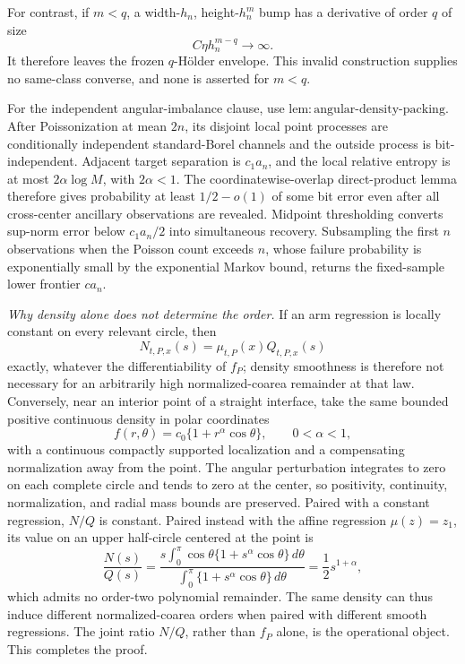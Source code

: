 For contrast, if \(m<q\), a width-\(h_n\), height-\(h_n^m\) bump has a derivative of order \(q\) of size
\[
 C\eta h_n^{m-q}\longrightarrow\infty.
\]
It therefore leaves the frozen \(q\)-H\"older envelope.  This invalid construction supplies no same-class converse, and none is asserted for \(m<q\).

For the independent angular-imbalance clause, use \(\mathrm{lem:angular\text{-}density\text{-}packing}\).  After Poissonization at mean \(2n\), its disjoint local point processes are conditionally independent standard-Borel channels and the outside process is bit-independent.  Adjacent target separation is \(c_1a_n\), and the local relative entropy is at most \(2\alpha\log M\), with \(2\alpha<1\).  The coordinatewise-overlap direct-product lemma therefore gives probability at least \(1/2-o(1)\) of some bit error even after all cross-center ancillary observations are revealed.  Midpoint thresholding converts sup-norm error below \(c_1a_n/2\) into simultaneous recovery.  Subsampling the first \(n\) observations when the Poisson count exceeds \(n\), whose failure probability is exponentially small by the exponential Markov bound, returns the fixed-sample lower frontier \(ca_n\).

\emph{Why density alone does not determine the order.}
If an arm regression is locally constant on every relevant circle, then
\[
 N_{t,P,x}(s)=\mu_{t,P}(x)Q_{t,P,x}(s)
\]
exactly, whatever the differentiability of \(f_P\); density smoothness is therefore not necessary for an arbitrarily high normalized-coarea remainder at that law.  Conversely, near an interior point of a straight interface, take the same bounded positive continuous density in polar coordinates
\[
 f(r,\theta)=c_0\{1+r^\alpha\cos\theta\},
 \qquad 0<\alpha<1,
\]
with a continuous compactly supported localization and a compensating normalization away from the point.  The angular perturbation integrates to zero on each complete circle and tends to zero at the center, so positivity, continuity, normalization, and radial mass bounds are preserved.  Paired with a constant regression, \(N/Q\) is constant.  Paired instead with the affine regression \(\mu(z)=z_1\), its value on an upper half-circle centered at the point is
\[
 \frac{N(s)}{Q(s)}
 =\frac{s\int_0^\pi\cos\theta\{1+s^\alpha\cos\theta\}\,d\theta}
 {\int_0^\pi\{1+s^\alpha\cos\theta\}\,d\theta}
 =\frac12s^{1+\alpha},
\]
which admits no order-two polynomial remainder.  The same density can thus induce different normalized-coarea orders when paired with different smooth regressions.  The joint ratio \(N/Q\), rather than \(f_P\) alone, is the operational object.  This completes the proof.